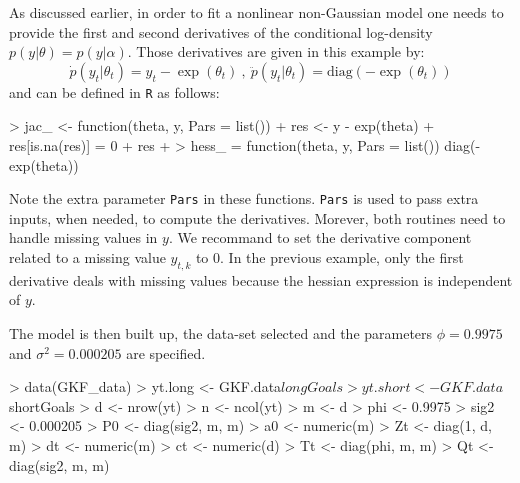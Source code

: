 \documentclass{article}
\newcommand{\R}{\texttt{R}\xspace}
\begin{document}
As discussed earlier, in order to fit a nonlinear non-Gaussian model one needs to provide the
first and second derivatives of the conditional log-density $p(y|\theta)=p(y|\alpha)$. Those
derivatives are given in this example by:
\begin{equation*}
  \dot{p}(y_t|\theta_t)
  = y_t -\exp(\theta_t) \ , \ \ddot{p}(y_t|\theta_t)=\text{diag}( -\exp(\theta_t))
\end{equation*}
and can be defined in \R as follows:
\begin{Schunk}
\begin{Sinput}
> jac_ <-  function(theta, y, Pars = list()) {
+     res <- y - exp(theta)
+     res[is.na(res)] = 0
+     res
+ }
> hess_ = function(theta, y, Pars = list()) diag(-exp(theta))
\end{Sinput}
\end{Schunk}
Note the extra parameter \texttt{Pars} in these functions. \texttt{Pars} is used to pass
extra inputs, when needed, to compute the derivatives. Morever, both routines need to handle
missing values in $y$. We recommand to set the derivative component related to a missing
value $y_{t,k}$ to 0. In the previous example, only the first derivative deals with missing
values because the hessian expression is independent of $y$.

The model is then built up, the data-set selected and the parameters $\phi =0.9975$ and
$\sigma^2=0.000205$ are specified.
\begin{Schunk}
\begin{Sinput}
> data(GKF_data)
> yt.long <- GKF.data$longGoals
> yt.short <- GKF.data$shortGoals
> d <- nrow(yt)
> n <- ncol(yt)
> m <- d
> phi <- 0.9975
> sig2 <- 0.000205
> P0 <- diag(sig2, m, m)
> a0 <- numeric(m)
> Zt <- diag(1, d, m)
> dt <- numeric(m)
> ct <- numeric(d)
> Tt <- diag(phi, m, m)
> Qt <- diag(sig2, m, m)
\end{Sinput}
\end{Schunk}
\end{document}
